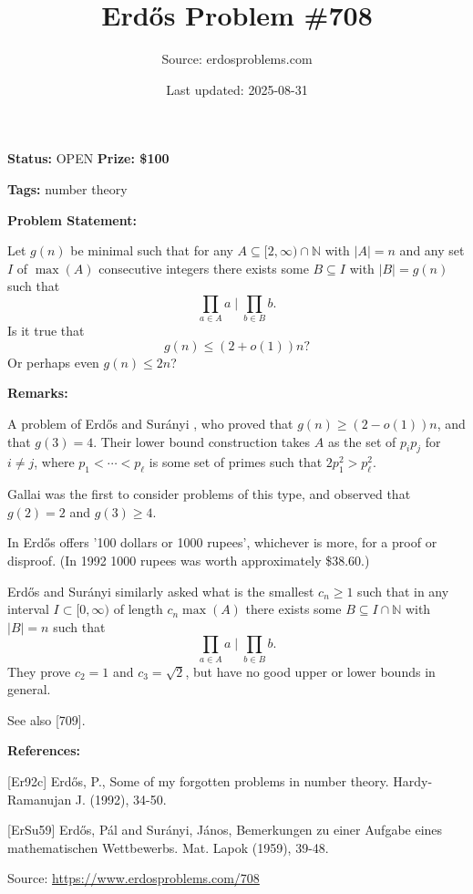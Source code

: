 \documentclass{article}
\title{Erd\H{o}s Problem \#708}
\date{Last updated: 2025-08-31}
\author{Source: erdosproblems.com}
\begin{document}
\maketitle

\noindent\textbf{Status:} OPEN \quad \textbf{Prize: \$100}

\noindent\textbf{Tags:} number theory

\medskip
\noindent\textbf{Problem Statement:}

Let $g(n)$ be minimal such that for any $A\subseteq [2,\infty)\cap \mathbb{N}$ with $\lvert A\rvert =n$ and any set $I$ of $\max(A)$ consecutive integers there exists some $B\subseteq I$ with $\lvert B\rvert=g(n)$ such that\[\prod_{a\in A} a \mid \prod_{b\in B}b.\]Is it true that\[g(n) \leq (2+o(1))n?\]Or perhaps even $g(n)\leq 2n$?

\bigskip
\noindent\textbf{Remarks:}

A problem of Erd\H{o}s and Sur\'{a}nyi \cite{ErSu59}, who proved that $g(n) \geq (2-o(1))n$, and that $g(3)=4$. Their lower bound construction takes $A$ as the set of $p_ip_j$ for $i\neq j$, where $p_1<\cdots <p_\ell$ is some set of primes such that $2p_1^2>p_\ell^2$.

Gallai was the first to consider problems of this type, and observed that $g(2)=2$ and $g(3)\geq 4$. 

In \cite{Er92c} Erd\H{o}s offers '100 dollars or 1000 rupees', whichever is more, for a proof or disproof. (In 1992 1000 rupees was worth approximately \$38.60.)

Erd\H{o}s and Sur\'{a}nyi similarly asked what is the smallest $c_n\geq 1$ such that in any interval $I\subset [0,\infty)$ of length $c_n\max(A)$ there exists some $B\subseteq I\cap \mathbb{N}$ with $\lvert B\rvert=n$ such that\[\prod_{a\in A} a \mid \prod_{b\in B}b.\]They prove $c_2=1$ and $c_3=\sqrt{2}$, but have no good upper or lower bounds in general.

See also [709].

\bigskip
\noindent\textbf{References:}

[Er92c] Erd\H{o}s, P., Some of my forgotten problems in number theory. Hardy-Ramanujan J. (1992), 34-50.
 
 [ErSu59] Erd\H{o}s, P\'{a}l and Sur\'{a}nyi, J\'{a}nos, Bemerkungen zu einer Aufgabe eines mathematischen
{W}ettbewerbs. Mat. Lapok (1959), 39-48.

\bigskip
\noindent\small{Source: \url{https://www.erdosproblems.com/708}}
\end{document}
